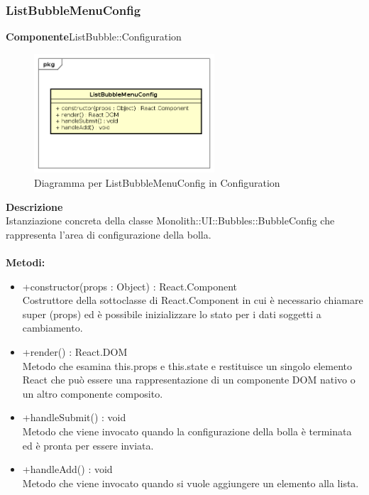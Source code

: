 \subsubsection{ListBubbleMenuConfig}
\textbf{Componente}ListBubble::Configuration\\
   \FloatBarrier
   \begin{figure}[ht]
   \centering
   \includegraphics[width=0.6\textwidth]{img/single-ListBubbleMenuConfig}
   \caption{{Diagramma per ListBubbleMenuConfig in Configuration}}
\end{figure}
\FloatBarrier
\textbf{Descrizione}\\
Istanziazione concreta della classe Monolith::UI::Bubbles::BubbleConfig che rappresenta l'area di configurazione della bolla. 
\\
\\
\textbf{Metodi:} 
\begin{itemize}
\item +constructor(props : Object) : React.Component 
\\
Costruttore della sottoclasse di React.Component in cui è necessario chiamare super (props) ed è possibile inizializzare lo stato per i dati soggetti a cambiamento.

\item +render() : React.DOM 
\\
Metodo che esamina this.props e this.state e restituisce un singolo elemento React che può essere una rappresentazione di un componente DOM nativo o un altro componente composito.

\item +handleSubmit() : void 
\\
Metodo che viene invocato quando la configurazione della bolla è terminata ed è pronta per essere inviata.

\item +handleAdd() : void 
\\
Metodo che viene invocato quando si vuole aggiungere un elemento alla lista.
\end{itemize} 


